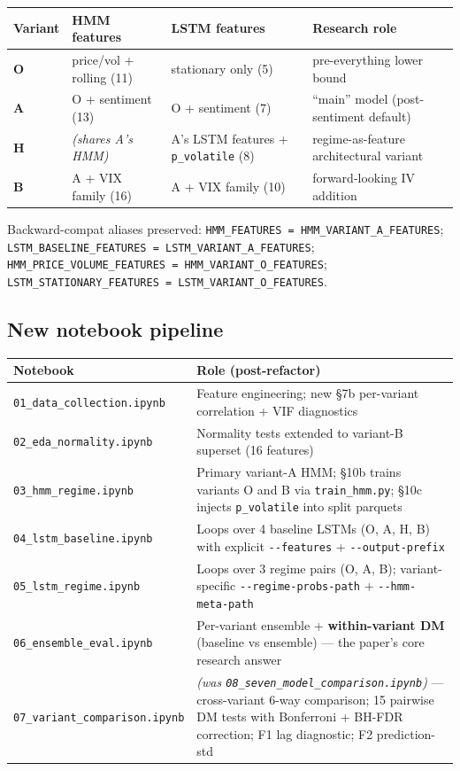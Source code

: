 \documentclass[11pt]{article}
\begin{document}
\begin{center}
\renewcommand{\arraystretch}{1.2}
\begin{tabular}{@{}l p{3.2cm} p{3.2cm} p{4.4cm}@{}}
\toprule
Variant & HMM features & LSTM features & Research role \\
\midrule
\textbf{O} & price/vol + rolling (11) & stationary only (5) & pre-everything lower bound \\
\textbf{A} & O + sentiment (13) & O + sentiment (7) & ``main'' model (post-sentiment default) \\
\textbf{H} & \emph{(shares A's HMM)} & A's LSTM features + \texttt{p\_volatile} (8) & regime-as-feature architectural variant \\
\textbf{B} & A + VIX family (16) & A + VIX family (10) & forward-looking IV addition \\
\bottomrule
\end{tabular}
\end{center}

Backward-compat aliases preserved: \texttt{HMM\_FEATURES = HMM\_VARIANT\_A\_FEATURES}; \texttt{LSTM\_BASELINE\_FEATURES = LSTM\_VARIANT\_A\_FEATURES}; \texttt{HMM\_PRICE\_VOLUME\_FEATURES = HMM\_VARIANT\_O\_FEATURES}; \texttt{LSTM\_STATIONARY\_FEATURES = LSTM\_VARIANT\_O\_FEATURES}.

\subsection*{New notebook pipeline}

\begin{center}
\renewcommand{\arraystretch}{1.2}
\begin{tabular}{@{}l p{9.5cm}@{}}
\toprule
Notebook & Role (post-refactor) \\
\midrule
\texttt{01\_data\_collection.ipynb} & Feature engineering; new \S 7b per-variant correlation + VIF diagnostics \\
\texttt{02\_eda\_normality.ipynb}   & Normality tests extended to variant-B superset (16 features) \\
\texttt{03\_hmm\_regime.ipynb}      & Primary variant-A HMM; \S 10b trains variants O and B via \texttt{train\_hmm.py}; \S 10c injects \texttt{p\_volatile} into split parquets \\
\texttt{04\_lstm\_baseline.ipynb}   & Loops over 4 baseline LSTMs (O, A, H, B) with explicit \texttt{-{}-features} + \texttt{-{}-output-prefix} \\
\texttt{05\_lstm\_regime.ipynb}     & Loops over 3 regime pairs (O, A, B); variant-specific \texttt{-{}-regime-probs-path} + \texttt{-{}-hmm-meta-path} \\
\texttt{06\_ensemble\_eval.ipynb}   & Per-variant ensemble + \textbf{within-variant DM} (baseline vs ensemble) --- the paper's core research answer \\
\texttt{07\_variant\_comparison.ipynb} & \emph{(was \texttt{08\_seven\_model\_comparison.ipynb})} --- cross-variant 6-way comparison; 15 pairwise DM tests with Bonferroni + BH-FDR correction; F1 lag diagnostic; F2 prediction-std \\
\bottomrule
\end{tabular}
\end{center}
\end{document}
